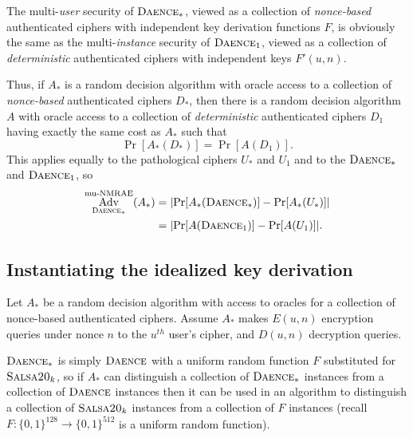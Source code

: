 \documentclass{article}
\def\operatorsc#1{{%
  \ifmmode\let\next=\operatorname\else\let\next=\relax\fi\next{\textsc{#1}}}}
\def\Salsa#1/{\operatorsc{Salsa#1}}
\def\DAENCE/{\operatorsc{Daence}}
\def\muNMRAE{%
  \ifmmode\def\next{\operatorname{mu-NMRAE}}%
    \else\def\next/{mu-\textsc{nmrae}}%
  \fi\next}
\DeclareMathOperator{\Adv}{Adv}
\begin{document}
The multi-\emph{user} security of $\DAENCE/_*$, viewed as a collection
 of \emph{nonce-based} authenticated ciphers with independent key
 derivation functions $F$, is obviously the same as the
 multi-\emph{instance} security of $\DAENCE/_1$, viewed as a
 collection of \emph{deterministic} authenticated ciphers with
 independent keys $F'(u,n)$.

Thus, if $A_*$ is a random decision algorithm with oracle access to a
 collection of \emph{nonce-based} authenticated ciphers $D_*$, then
 there is a random decision algorithm $A$ with oracle access to a
 collection of \emph{deterministic} authenticated ciphers $D_1$ having
 exactly the same cost as $A_*$ such that
\[
  \Pr[A_*(D_*)] = \Pr[A(D_1)].
\]
This applies equally to the pathological ciphers $U_*$ and $U_1$ and
 to the $\DAENCE/_*$ and $\DAENCE/_1$, so
%
\begin{align*}
  \Adv^{\muNMRAE}_{\DAENCE/_*}(A_*)
  &= \lvert\Pr[A_*(\DAENCE/_*)] - \Pr[A_*(U_*)]\rvert \\
  &= \lvert\Pr[A(\DAENCE/_1)] - \Pr[A(U_1)]\rvert.
\end{align*}

\subsection{Instantiating the idealized key derivation}

Let $A_*$ be a random decision algorithm with access to oracles for a
 collection of nonce-based authenticated ciphers.
Assume $A_*$ makes $E(u,n)$ encryption queries under nonce $n$ to the
 $u^{\mathit{th}}$ user's cipher, and $D(u,n)$ decryption queries.

$\DAENCE/_*$ is simply $\DAENCE/$ with a uniform random function $F$
 substituted for $\Salsa20/_k$, so if $A_*$ can distinguish a
 collection of $\DAENCE/_*$ instances from a collection of $\DAENCE/$
 instances then it can be used in an algorithm to distinguish a
 collection of $\Salsa20/_k$ instances from a collection of $F$
 instances (recall $F\colon \{0,1\}^{128} \to \{0,1\}^{512}$ is a
 uniform random function).
\end{document}
